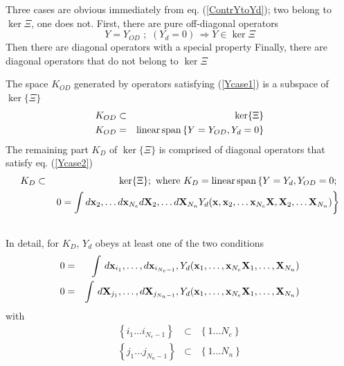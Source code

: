 Three cases are obvious immediately from eq. (\ref{ContrYtoYd}); two belong
to $\ker \Xi $, one does not. First, there are pure off-diagonal operators 
\begin{equation}
Y=Y_{OD}\,\,;\,\,(Y_{d}=0)\,\Rightarrow Y\in \ker \Xi  \label{Ycase1}
\end{equation}%
Then there are diagonal operators with a special property %
Finally, there are diagonal operators that do not belong to $\ker \Xi $ 

The space $K_{OD}$ generated by operators satisfying (\ref{Ycase1}) is a
subspace of $\ker \{\Xi \}$ 
\begin{eqnarray}
K_{OD} &\subset &\ker \{\Xi \}  \nonumber \\
K_{OD} &=&{\rm linear\,span}\left\{ Y=Y_{OD},Y_{d}=0\right\}  \label{koddefn}
\end{eqnarray}%
The remaining part $K_{D}$ of $\ker \{\Xi \}$ is comprised of diagonal
operators that satisfy eq. (\ref{Ycase2}) 
\begin{eqnarray}
K_{D} &\subset &\ker \{\Xi \};\text{ where }K_{D}={\rm linear\,span}\left\{
Y=Y_{d},Y_{OD}=0;\right.  \nonumber \\
&&\left. 0=\int d{\bf x}_{2},\ldots d{\bf x}_{N_{e}}d{\bf X}_{2},\ldots d%
{\bf X}_{N_{n}}Y_{d}({\bf x},{\bf x}_{2},\ldots {\bf x}_{N_{e}}{\bf X},{\bf X%
}_{2},\ldots {\bf X}_{N_{n}})\right\}  \nonumber \\
&&  \label{kddefn}
\end{eqnarray}%
In detail, for $K_{D}$, $Y_{d}$ obeys at least one of the two conditions 
\begin{eqnarray}
0 &=&\int \,d{\bf x}_{i_{1}},\ldots ,d{\bf x}_{i_{N_{e}-1}},Y_{d}({\bf x}%
_{1},\ldots ,{\bf x}_{N_{e}}{\bf X}_{1},\ldots ,{\bf X}_{N_{n}})  \nonumber
\\
0 &=&\int \,d{\bf X}_{j_{1}},\ldots ,d{\bf X}_{j_{N_{n}-1}},Y_{d}({\bf x}%
_{1},\ldots ,{\bf x}_{N_{e}}{\bf X}_{1},\ldots ,{\bf X}_{N_{n}})
\label{kddefn1}
\end{eqnarray}%
with 
\begin{eqnarray}
\left\{ i_{1}\ldots i_{N_{e}-1}\right\} &\subset &\left\{ 1\ldots
N_{e}\right\}  \nonumber \\
\left\{ j_{1}\ldots j_{N_{n}-1}\right\} &\subset &\left\{ 1\ldots
N_{n}\right\}  \label{indices}
\end{eqnarray}

